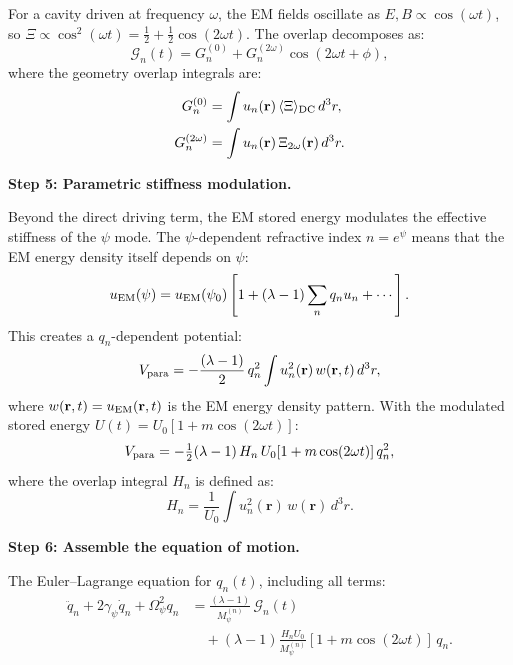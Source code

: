 \documentclass[12pt,aps,prd,twocolumn,superscriptaddress,nofootinbib]{revtex4-2}
\newcommand{\Opsi}{\Omega_\psi}
\newcommand{\gpsi}{\gamma_\psi}
\newcommand{\Mpsi}{M_\psi}
\newcommand{\half}{\tfrac{1}{2}}
\newcommand{\br}{\mathbf{r}}
\begin{document}
For a cavity driven at frequency $\omega$, the EM fields oscillate
as $E,B \propto \cos(\omega t)$, so $\Xi \propto \cos^2(\omega t)
= \half + \half\cos(2\omega t)$.  The overlap decomposes as:
\begin{equation}
\mathcal{G}_n(t) = G_n^{(0)} + G_n^{(2\omega)}\cos(2\omega t + \phi),
\label{eq:overlap_decomp}
\end{equation}
where the geometry overlap integrals are:
\begin{align}
G_n^{(0)} &= \int u_n(\br)\,\langle\Xi\rangle_{\rm DC}\,d^3r,
\label{eq:G_DC}\\
G_n^{(2\omega)} &= \int u_n(\br)\,\Xi_{2\omega}(\br)\,d^3r.
\label{eq:G_2omega}
\end{align}

\textbf{Step 5: Parametric stiffness modulation.}

Beyond the direct driving term, the EM stored energy modulates
the effective stiffness of the $\psi$ mode.  The $\psi$-dependent
refractive index $n=e^\psi$ means that the EM energy density itself
depends on $\psi$:
\begin{equation}
u_{\rm EM}(\psi) = u_{\rm EM}(\psi_0)\left[1 + (\lambda-1)
\sum_n q_n u_n + \cdots\right].
\label{eq:uEM_psi}
\end{equation}
This creates a $q_n$-dependent potential:
\begin{equation}
V_{\rm para} = -\frac{(\lambda-1)}{2}\,q_n^2\int u_n^2(\br)\,
w(\br,t)\,d^3r,
\label{eq:V_para}
\end{equation}
where $w(\br,t) = u_{\rm EM}(\br,t)$ is the EM energy density
pattern.  With the modulated stored energy $U(t) = U_0[1+m\cos(2\omega t)]$:
\begin{equation}
V_{\rm para} = -\half(\lambda-1)\,H_n\,U_0[1+m\cos(2\omega t)]\,q_n^2,
\label{eq:V_para_explicit}
\end{equation}
where the overlap integral $H_n$ is defined as:
\begin{equation}
H_n = \frac{1}{U_0}\int u_n^2(\br)\,w(\br)\,d^3r.
\label{eq:H_overlap}
\end{equation}

\textbf{Step 6: Assemble the equation of motion.}

The Euler--Lagrange equation for $q_n(t)$, including all terms:
\begin{align}
\ddot{q}_n + 2\gpsi\dot{q}_n + \Opsi^2 q_n
&= \frac{(\lambda-1)}{\Mpsi^{(n)}}\,\mathcal{G}_n(t)
\nonumber\\
&\quad + (\lambda-1)\frac{H_n U_0}{\Mpsi^{(n)}}
[1+m\cos(2\omega t)]\,q_n.
\label{eq:full_mode_eq}
\end{align}
\end{document}

